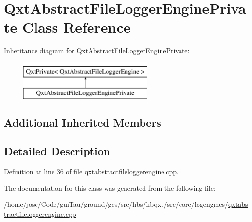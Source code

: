 \hypertarget{class_qxt_abstract_file_logger_engine_private}{\section{Qxt\-Abstract\-File\-Logger\-Engine\-Private Class Reference}
\label{class_qxt_abstract_file_logger_engine_private}
}
Inheritance diagram for Qxt\-Abstract\-File\-Logger\-Engine\-Private\-:\begin{figure}[H]
\begin{center}
\leavevmode
\includegraphics[height=2.000000cm]{class_qxt_abstract_file_logger_engine_private}
\end{center}
\end{figure}
\subsection*{Additional Inherited Members}


\subsection{Detailed Description}


Definition at line 36 of file qxtabstractfileloggerengine.\-cpp.



The documentation for this class was generated from the following file\-:\begin{DoxyCompactItemize}
\item 
/home/jose/\-Code/gui\-Tau/ground/gcs/src/libs/libqxt/src/core/logengines/\hyperlink{qxtabstractfileloggerengine_8cpp}{qxtabstractfileloggerengine.\-cpp}\end{DoxyCompactItemize}
